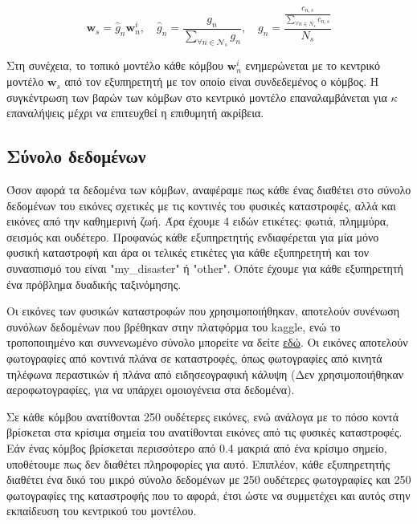 \vspace{-5pt}

\begin{equation}
   \mathbf{w}_s = \hat{g}_n \mathbf{w}_n^i, \quad \hat{g}_n = \frac{g_n}{\sum\limits_{\forall n \in \mathcal{N}_s} g_n}, \quad g_n = \frac{\frac{c_{n,s}}{\sum\limits_{\forall n \in N_s} c_{n,s}}}{N_s}
    \label{eq15}
\end{equation}

\vspace{-5pt}

Στη συνέχεια, το τοπικό μοντέλο κάθε κόμβου $\mathbf{w}_n^i$ ενημερώνεται με το κεντρικό μοντέλο $\mathbf{w}_s$ από τον εξυπηρετητή με τον οποίο είναι συνδεδεμένος ο κόμβος. Η συγκέντρωση των βαρών των κόμβων στο κεντρικό μοντέλο επαναλαμβάνεται για $\kappa$ επαναλήψεις μέχρι να επιτευχθεί η επιθυμητή ακρίβεια.

\subsection{Σύνολο δεδομένων}

Όσον αφορά τα δεδομένα των κόμβων, αναφέραμε πως κάθε ένας διαθέτει στο σύνολο δεδομένων του εικόνες σχετικές με τις κοντινές του φυσικές καταστροφές, αλλά και εικόνες από την καθημερινή ζωή. Άρα έχουμε 4 ειδών ετικέτες: φωτιά, πλημμύρα, σεισμός και ουδέτερο. Προφανώς κάθε εξυπηρετητής ενδιαφέρεται για μία μόνο φυσική καταστροφή και άρα οι τελικές ετικέτες για κάθε εξυπηρετητή και τον συνασπισμό του είναι "my\_disaster" ή "other". Οπότε έχουμε για κάθε εξυπηρετητή ένα πρόβλημα δυαδικής ταξινόμησης.

Οι εικόνες των φυσικών καταστροφών που χρησιμοποιήθηκαν, αποτελούν συνένωση συνόλων δεδομένων που βρέθηκαν στην πλατφόρμα του kaggle, ενώ το τροποποιημένο και συννενωμένο σύνολο μπορείτε να δείτε \underline{εδώ}. Οι εικόνες αποτελούν φωτογραφίες από κοντινά πλάνα σε καταστροφές, όπως φωτογραφίες από κινητά τηλέφωνα περαστικών ή πλάνα από ειδησεογραφική κάλυψη (Δεν χρησιμοποιήθηκαν αεροφωτογραφίες, για να υπάρχει ομοιογένεια στα δεδομένα).

Σε κάθε κόμβου ανατίθονται 250 ουδέτερες εικόνες, ενώ ανάλογα με το πόσο κοντά βρίσκεται στα κρίσιμα σημεία του ανατίθονται εικόνες από τις φυσικές καταστροφές. Εάν ένας κόμβος βρίσκεται περισσότερο από 0.4 μακριά από ένα κρίσιμο σημείο, υποθέτουμε πως δεν διαθέτει πληροφορίες για αυτό. Επιπλέον, κάθε εξυπηρετητής διαθέτει ένα δικό του μικρό σύνολο δεδομένων με 250 ουδέτερες φωτογραφίες και 250 φωτογραφίες της καταστροφής που το αφορά, έτσι ώστε να συμμετέχει και αυτός στην εκπαίδευση του κεντρικού του μοντέλου.

